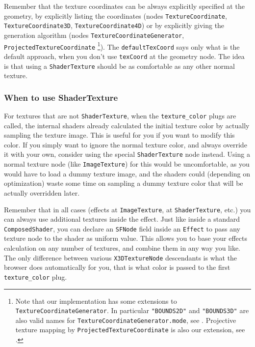 \documentclass{acmsiggraph}                     %
\begin{document}
Remember that the texture coordinates can be always explicitly specified
at the geometry, by explicitly listing the coordinates (nodes
\texttt{TextureCoordinate}, \texttt{TextureCoordinate3D},
\texttt{TextureCoordinate4D}) or by explicitly giving the generation
algorithm (nodes \texttt{TextureCoordinateGenerator},
\texttt{ProjectedTextureCoordinate} \footnote{
    Note that our implementation has some extensions
    to \texttt{TextureCoordinateGenerator}. In particular
    \texttt{"BOUNDS2D"} and \texttt{"BOUNDS3D"} are also valid names for
    \texttt{TextureCoordinateGenerator.mode}, see
    \cite{vrmleng:texcoordbounds}.
    Projective texture mapping by \texttt{ProjectedTextureCoordinate}
    is also our extension, see \cite{vrmleng:projectivetexturing}.}).
The \texttt{defaultTexCoord} says only what is the default approach,
when you don't use \texttt{texCoord} at the geometry node.
The idea is that using a \texttt{ShaderTexture} should be as comfortable
as any other normal texture.

\subsubsection{When to use ShaderTexture}

For textures that are not \texttt{ShaderTexture},
when the \texttt{texture\_color} plugs are called,
the internal shaders already calculated the initial texture
color by actually sampling the texture image. This is useful for you if you
want to modify this color. If you simply want to ignore the normal
texture color, and always override it with your own, consider using
the special \texttt{ShaderTexture} node instead. Using
a normal texture node (like \texttt{ImageTexture}) for this
would be uncomfortable, as you would have to load a dummy texture image,
and the shaders could (depending on optimization) waste some time
on sampling a dummy texture color that will be actually overridden later.

Remember that in all cases (effects at \texttt{ImageTexture},
at \texttt{ShaderTexture}, etc.) you can always use additional
textures inside the effect. Just like inside a standard \texttt{ComposedShader},
you can declare an \texttt{SFNode} field inside an \texttt{Effect}
to pass any texture node to the shader as uniform value.
This allows you to base your effects calculation on any number of textures,
and combine them in any way you like. The only difference
between various \texttt{X3DTextureNode} descendants is what the browser
does automatically for you, that is what color is passed
to the first \texttt{texture\_color} plug.
\end{document}
